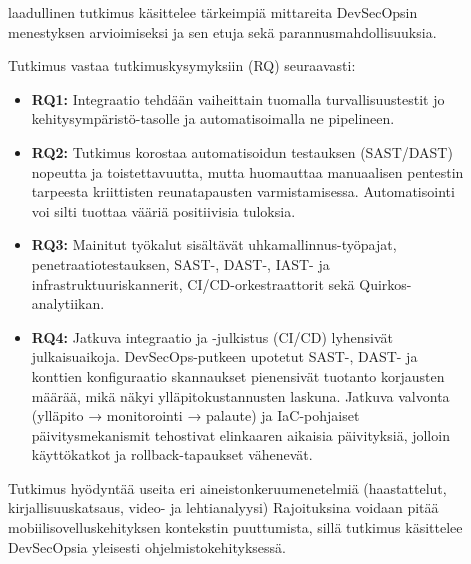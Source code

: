 \documentclass[bscthesis,finnish,oneside,biblatex]{uefcsthesis}
\begin{document}
\begin{description}
    \item[\cite{chung2024_devsecops}] laadullinen tutkimus käsittelee tärkeimpiä mittareita DevSecOpsin menestyksen arvioimiseksi ja sen etuja sekä parannusmahdollisuuksia.

    Tutkimus vastaa tutkimuskysymyksiin (RQ) seuraavasti:
    \begin{itemize}
        \item \textbf{RQ1:} Integraatio tehdään vaiheittain tuomalla turvallisuustestit jo kehitysympäristö-tasolle ja automatisoimalla ne pipelineen.
        \item \textbf{RQ2:} Tutkimus korostaa automatisoidun testauksen (SAST/DAST) nopeutta ja toistettavuutta, mutta huomauttaa manuaalisen pentestin tarpeesta kriittisten reunatapausten varmistamisessa. Automatisointi voi silti tuottaa vääriä positiivisia tuloksia.
        \item \textbf{RQ3:} Mainitut työkalut sisältävät uhkamallinnus-työpajat, penetraatiotestauksen, SAST-, DAST-, IAST- ja infrastruktuuriskannerit, CI/CD-orkestraattorit sekä Quirkos-analytiikan.
        \item \textbf{RQ4:} Jatkuva integraatio ja -julkistus (CI/CD) lyhensivät julkaisuaikoja. DevSecOps-putkeen upotetut SAST-, DAST- ja konttien konfiguraatio skannaukset pienensivät tuotanto korjausten määrää, mikä näkyi ylläpitokustannusten laskuna. Jatkuva valvonta (ylläpito → monitorointi → palaute) ja IaC-pohjaiset päivitysmekanismit tehostivat elinkaaren aikaisia päivityksiä, jolloin käyttökatkot ja rollback-tapaukset vähenevät.
    \end{itemize}

    Tutkimus hyödyntää useita eri aineistonkeruumenetelmiä (haastattelut, kirjallisuuskatsaus, video- ja lehtianalyysi)
    Rajoituksina voidaan pitää mobiilisovelluskehityksen kontekstin puuttumista, sillä tutkimus käsittelee DevSecOpsia yleisesti ohjelmistokehityksessä.
\end{description}
\end{document}
